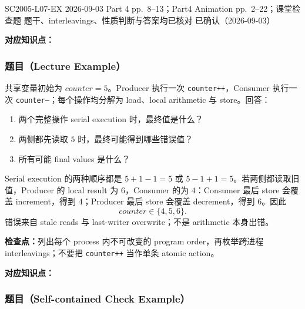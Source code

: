 

\examplemeta
  {SC2005-L07-EX}
  {2026-09-03}
  {Part 4 pp.~8--13；Part4 Animation pp.~2--22；课堂检查题}
  {题干、interleavings、性质判断与答案均已核对}
  {已确认（2026-09-03）}


\textbf{对应知识点：}

\subsubsection*{题目（Lecture Example）}

共享变量初始为 $counter=5$。Producer 执行一次 \texttt{counter++}，Consumer 执行一次 \texttt{counter--}；每个操作均分解为 load、local arithmetic 与 store。回答：
\begin{enumerate}
  \item 两个完整操作 serial execution 时，最终值是什么？
  \item 两侧都先读取 $5$ 时，最终可能得到哪些错误值？
  \item 所有可能 final values 是什么？
\end{enumerate}

\begin{checkedsolution}
Serial execution 的两种顺序都是 $5+1-1=5$ 或 $5-1+1=5$。若两侧都读取旧值，Producer 的 local result 为 $6$，Consumer 的为 $4$：Consumer 最后 store 会覆盖 increment，得到 $4$；Producer 最后 store 会覆盖 decrement，得到 $6$。因此
\[
  \boxed{counter\in\{4,5,6\}}.
\]
错误来自 stale reads 与 last-writer overwrite；不是 arithmetic 本身出错。
\end{checkedsolution}

\textbf{检查点：}列出每个 process 内不可改变的 program order，再枚举跨进程 interleavings；不要把 \texttt{counter++} 当作单条 atomic action。


\textbf{对应知识点：}

\subsubsection*{题目（Self-contained Check Example）}

